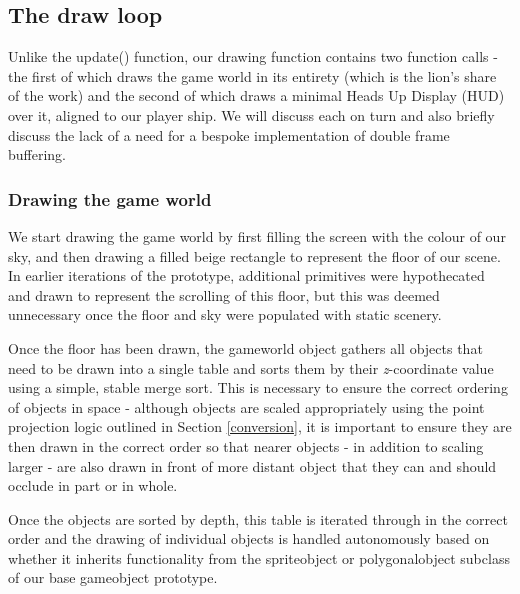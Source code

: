 \documentclass[11pt]{article}
\begin{document}
\subsection{The draw loop}\label{draw}

Unlike the \textunderscore update() function, our drawing function contains two function calls - the first of which
draws the game world in its entirety (which is the lion's share of the work) and the second of which
draws a minimal Heads Up Display (HUD) over it, aligned to our player ship. We will discuss each on turn
and also briefly discuss the lack of a need for a bespoke implementation of double frame buffering.

\subsubsection*{Drawing the game world}

We start drawing the game world by first filling the screen with the colour of our sky, and then 
drawing a filled beige rectangle to represent the floor of our scene. In earlier iterations of the
prototype, additional primitives were hypothecated and drawn to represent the scrolling of this floor,
but this was deemed unnecessary once the floor and sky were populated with static scenery.

Once the floor has been drawn, the game\textunderscore world object gathers all objects that need to be
drawn into a single table and sorts them by their \textit{z}-coordinate value using a simple, stable
merge sort. This is necessary to ensure the correct ordering of objects in space - although objects
are scaled appropriately using the point projection logic outlined in Section \ref{conversion}, it
is important to ensure they are then drawn in the correct order so that nearer objects - in addition
to scaling larger - are also drawn in front of more distant object that they can and should occlude in
part or in whole.


Once the objects are sorted by depth, this table is iterated through in the correct order and the
drawing of individual objects is handled autonomously based on whether it inherits functionality
from the sprite\textunderscore object or polygonal\textunderscore object subclass of our
base game\textunderscore object prototype.
\end{document}
